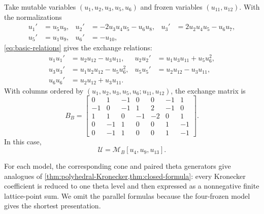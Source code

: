 \documentclass[11pt,reqno]{amsart}
\numberwithin{equation}{section}
\theoremstyle{remark}
\newcommand{\UR}{\mathscr U}
\begin{document}
Take mutable variables $(u_1,u_2,u_3,u_5,u_6)$ and frozen variables
$(u_{11},u_{12})$.  With the normalizations
\begin{equation*}
 \begin{aligned}
 u_1'&=u_5u_9,&
 u_2'&=-2u_3u_4u_5-u_6u_8,&
 u_3'&=2u_2u_4u_5-u_6u_7,\\
 u_5'&=u_1u_9,&
 u_6'&=-u_{10},
 \end{aligned}
\end{equation*}
\eqref{eq:basic-relations} gives the exchange relations:
\begin{align*}
 u_1u_1'&=u_2u_{12}-u_3u_{11},
 &u_2u_2'&=u_1u_3u_{11}+u_5u_6^2,\\
 u_3u_3'&=u_1u_2u_{12}-u_5u_6^2,
 &u_5u_5'&=u_2u_{12}-u_3u_{11},\\
 u_6u_6'&=u_2u_{12}+u_3u_{11}.
\end{align*}
With columns ordered by
$(u_1,u_2,u_3,u_5,u_6;u_{11},u_{12})$, the exchange matrix is
\[
 B_B=
 \begin{bmatrix}
 0& 1&-1& 0& 0&-1& 1\\
-1& 0&-1& 1& 2&-1& 0\\
 1& 1& 0&-1&-2& 0& 1\\
 0&-1& 1& 0& 0& 1&-1\\
 0&-1& 1& 0& 0& 1&-1
 \end{bmatrix}.
\]
In this case, 
\[ \UR=\mathcal M_B[u_4,u_9,u_{13}]. \]

For each model, the corresponding cone and paired theta generators give
analogues of \cref{thm:polyhedral-Kronecker,thm:closed-formula}: every
Kronecker coefficient is reduced to one theta level and then expressed as a
nonnegative finite lattice-point sum.  We omit the parallel formulas because
the four-frozen model gives the shortest presentation.



\end{document}
